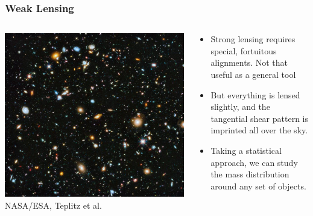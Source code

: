 \documentclass{beamer}
\begin{document}
\frame
{
    \frametitle{Weak Lensing}

    \begin{columns}

        \begin{column}{0.5\textwidth}
            \begin{center}
                \includegraphics[width=\textwidth]{hubble-ultra-deep-scaled.jpg}
                \newline
                {\tiny  NASA/ESA, Teplitz et al.}
            \end{center}
        \end{column}

        \begin{column}{0.5\textwidth}    
            \begin{itemize}

                \item Strong lensing requires special, fortuitous alignments.
                    Not that useful as a general tool

                \item But everything is lensed slightly, and the {\color{gold} tangential shear}
                    pattern is imprinted all over the sky.

                \item Taking a statistical approach, we can study the mass
                    distribution around any set of objects.

            \end{itemize}
        \end{column}

    \end{columns}
}
\end{document}
